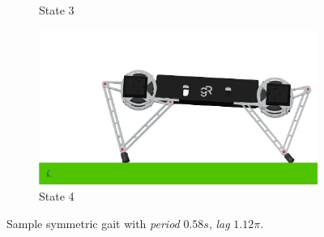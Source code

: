 \documentclass[conference,11pt,letterpaper]{IEEEtran}
\begin{document}
\begin{figure}[t!]
\begin{subfigure}[t]{0.45\linewidth}
        \caption{State 3}
    \end{subfigure}%
    \begin{subfigure}[t]{0.45\linewidth}
        \includegraphics[width=\textwidth]{symm_snap4}
        \caption{State 4}
    \end{subfigure}%
    \caption{Sample symmetric gait with \emph{period} $0.58 s$, \emph{lag} $1.12\pi$.}
    \label{fig:sym_gait}
\end{figure}
\end{document}
